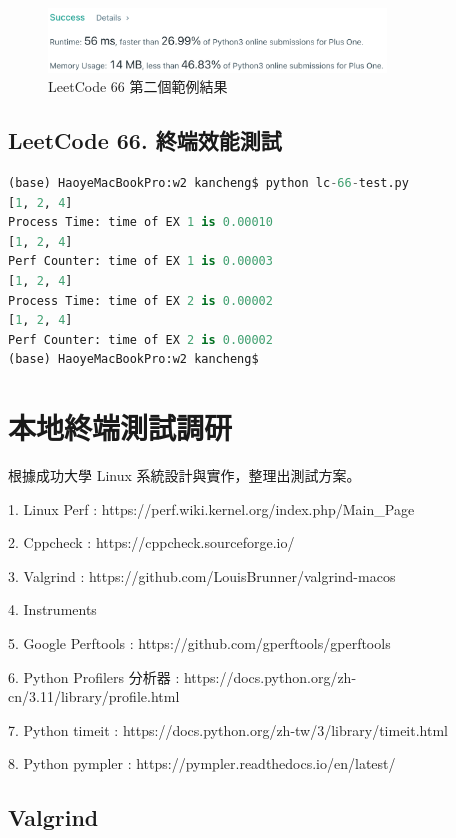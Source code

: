 \documentclass[10pt,UTF8]{ctexart}
\begin{document}
\begin{figure}[H]
\centering 
\includegraphics[width=0.80\textwidth]{lc-66-2.png} 
\caption{LeetCode 66 第二個範例結果}
\label{Test}
\end{figure}

\subsection{LeetCode 66. 終端效能測試}

\begin{lstlisting}[language={python}]
(base) HaoyeMacBookPro:w2 kancheng$ python lc-66-test.py 
[1, 2, 4]
Process Time: time of EX 1 is 0.00010
[1, 2, 4]
Perf Counter: time of EX 1 is 0.00003
[1, 2, 4]
Process Time: time of EX 2 is 0.00002
[1, 2, 4]
Perf Counter: time of EX 2 is 0.00002
(base) HaoyeMacBookPro:w2 kancheng$
\end{lstlisting}

\newpage

\section{本地終端測試調研}

根據成功大學 Linux 系統設計與實作，整理出測試方案。

1. Linux Perf : https://perf.wiki.kernel.org/index.php/Main\_Page

2. Cppcheck : https://cppcheck.sourceforge.io/

3. Valgrind : https://github.com/LouisBrunner/valgrind-macos

4. Instruments

5. Google Perftools : https://github.com/gperftools/gperftools

6. Python Profilers 分析器 : https://docs.python.org/zh-cn/3.11/library/profile.html

7. Python timeit : https://docs.python.org/zh-tw/3/library/timeit.html

8. Python pympler : https://pympler.readthedocs.io/en/latest/

\subsection{Valgrind}
\end{document}
